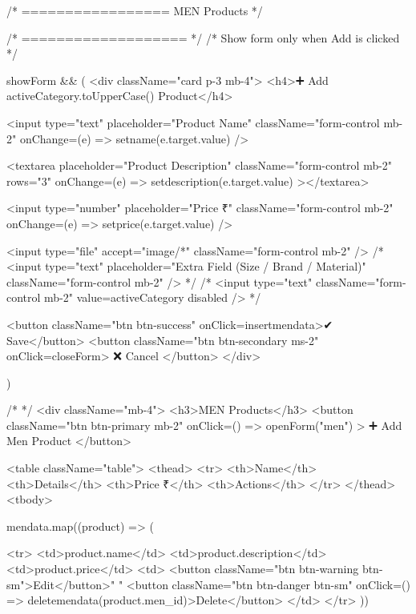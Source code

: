 {      {/* ================= MEN Products */}

      {/* =================== */}
      {/* Show form only when Add is clicked */}

      {showForm && (
        <div className="card p-3 mb-4">
          <h4>➕ Add {activeCategory.toUpperCase()} Product</h4>

          <input
            type="text"
            placeholder="Product Name"
            className="form-control mb-2" onChange={(e) => setname(e.target.value)}
          />

          <textarea
            placeholder="Product Description"
            className="form-control mb-2"
            rows="3" onChange={(e) => setdescription(e.target.value)}
          ></textarea>

          <input
            type="number"
            placeholder="Price ₹"
            className="form-control mb-2" onChange={(e) => setprice(e.target.value)}
          />

          <input
            type="file"
            accept="image/*"
            className="form-control mb-2"
          />
          {/* <input
              type="text"
              placeholder="Extra Field (Size / Brand / Material)"
              className="form-control mb-2"
            /> */}
          {/* 
              <input
                type="text"
                className="form-control mb-2"
                value={activeCategory}
                disabled
              /> */}

          <button className="btn btn-success" onClick={insertmendata}>✔ Save</button>
          <button className="btn btn-secondary ms-2" onClick={closeForm}>
            ❌ Cancel
          </button>
        </div>

      )}
      {/*  */}
      <div className="mb-4">
        <h3>MEN Products</h3>
        <button
          className="btn btn-primary mb-2"
          onClick={() => openForm("men")}
        >
          ➕ Add Men Product
        </button>

        <table className="table">
          <thead>
            <tr>
              <th>Name</th>
              <th>Details</th>
              <th>Price ₹</th>
              <th>Actions</th>
            </tr>
          </thead>
          <tbody>

            {mendata.map((product) => (

              <tr>
                <td>{product.name}</td>
                <td>{product.description}</td>
                <td>{product.price}</td>
                <td>
                  <button className="btn btn-warning btn-sm">Edit</button>{" "}
                  <button className="btn btn-danger btn-sm" onClick={() => deletemendata(product.men_id)}>Delete</button>
                </td>
              </tr>
            ))}

}
